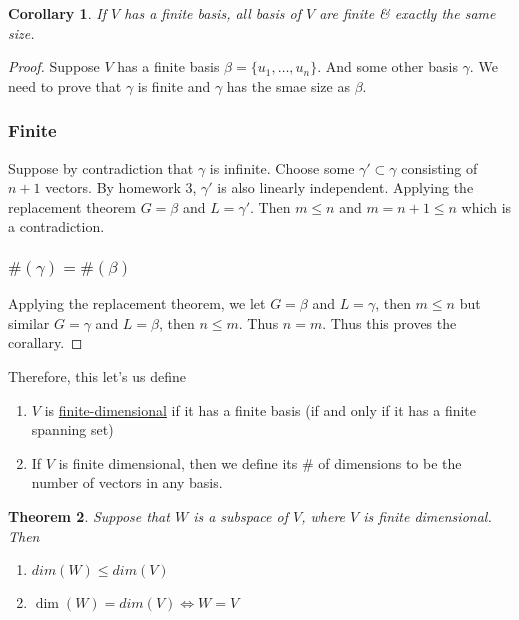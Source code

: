 \documentclass{article}
\newtheorem{theorem}{Theorem}[section]
\newtheorem{corollary}[theorem]{Corollary}
\newtheorem{one minute paper}[theorem]{One Minute Paper}
\begin{document}
\begin{corollary}
    If $V$ has a finite basis, all basis of $V$ are finite \& exactly the same size. 
\end{corollary}

\begin{proof}
    Suppose $V$ has a finite basis $\beta = \{u_1, \dots, u_n\}$. And some other basis $\gamma$. We need to prove that $\gamma$ is finite and $\gamma$ has the smae size as $\beta$. 

    \subsubsection*{Finite}

    Suppose by contradiction that $\gamma$ is infinite. Choose some $\gamma' \subset \gamma$ consisting of $n+1$ vectors. By homework 3, $\gamma'$ is also linearly independent. Applying
    the replacement theorem $G = \beta$ and $L = \gamma'$. Then $m \leq n$ and $m = n + 1 \leq n$ which is a contradiction. 

    \subsubsection*{\textbf{$\#(\gamma) = \#(\beta)$}}

    Applying the replacement theorem, we let $G = \beta$ and $L = \gamma$, then $m \leq n$ but similar $G = \gamma$ and $L = \beta$, then $n \leq m$. Thus $n = m$. Thus this proves the corallary. 
\end{proof}

Therefore, this let's us define 
\begin{enumerate}
    \item $V$ is \underline{finite-dimensional} if it has a finite basis (if and only if it has a finite spanning set)
    \item If $V$ is finite dimensional, then we define its $\#$ of dimensions to be the number of vectors in any basis. 
\end{enumerate}

\begin{theorem}
    Suppose that $W$ is a subspace of $V$, where $V$ is finite dimensional. Then 
    \begin{enumerate}
        \item $dim(W) \leq dim(V)$
        \item $\dim(W) = dim(V) \iff W = V$
    \end{enumerate}
\end{theorem}
\end{document}
